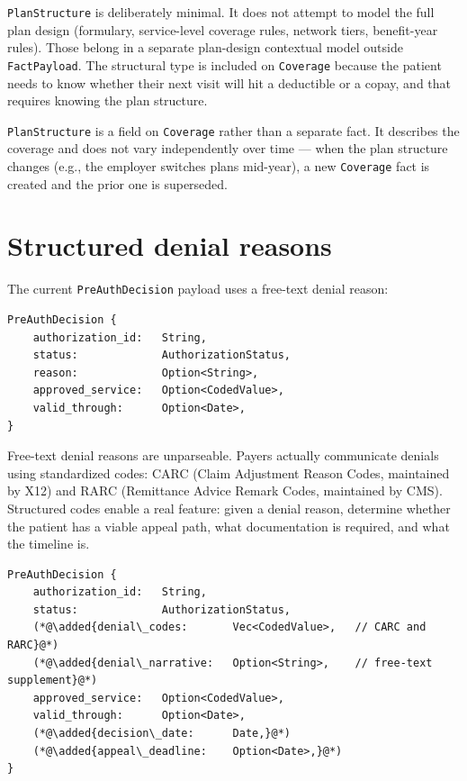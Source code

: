 \documentclass[11pt]{article}
\newcommand{\added}[1]{\textcolor{accentblue}{#1}}
\begin{document}
\texttt{PlanStructure} is deliberately minimal. It does not attempt to
model the full plan design (formulary, service-level coverage rules,
network tiers, benefit-year rules). Those belong in a separate
plan-design contextual model outside \texttt{FactPayload}. The
structural type is included on \texttt{Coverage} because the patient
needs to know whether their next visit will hit a deductible or a
copay, and that requires knowing the plan structure.

\texttt{PlanStructure} is a field on \texttt{Coverage} rather than a
separate fact. It describes the coverage and does not vary
independently over time --- when the plan structure changes (e.g., the
employer switches plans mid-year), a new \texttt{Coverage} fact is
created and the prior one is superseded.

\section{Structured denial reasons}
\label{sec:denial-codes}

The current \texttt{PreAuthDecision} payload uses a free-text denial
reason:

\begin{lstlisting}
PreAuthDecision {
    authorization_id:   String,
    status:             AuthorizationStatus,
    reason:             Option<String>,
    approved_service:   Option<CodedValue>,
    valid_through:      Option<Date>,
}
\end{lstlisting}

Free-text denial reasons are unparseable. Payers actually communicate
denials using standardized codes: CARC (Claim Adjustment Reason Codes,
maintained by X12) and RARC (Remittance Advice Remark Codes, maintained
by CMS). Structured codes enable a real feature: given a denial reason,
determine whether the patient has a viable appeal path, what
documentation is required, and what the timeline is.

\begin{lstlisting}
PreAuthDecision {
    authorization_id:   String,
    status:             AuthorizationStatus,
    (*@\added{denial\_codes:       Vec<CodedValue>,   // CARC and RARC}@*)
    (*@\added{denial\_narrative:   Option<String>,    // free-text supplement}@*)
    approved_service:   Option<CodedValue>,
    valid_through:      Option<Date>,
    (*@\added{decision\_date:      Date,}@*)
    (*@\added{appeal\_deadline:    Option<Date>,}@*)
}
\end{lstlisting}
\end{document}
